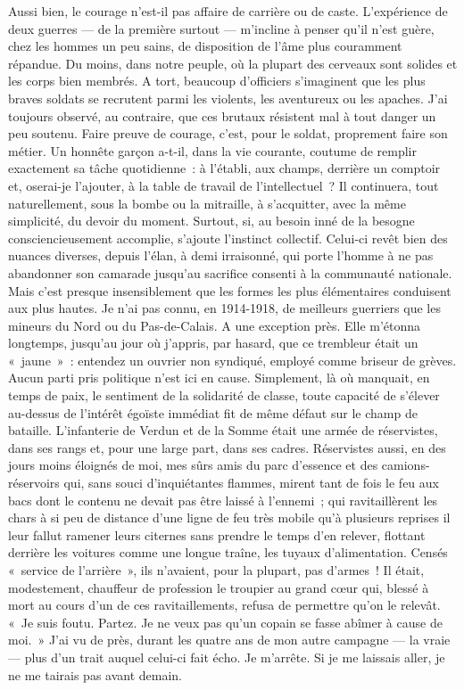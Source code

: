 \documentclass[french,twoside]{book} %
\begin{document}
Aussi bien, le courage n’est-il pas affaire de carrière ou de caste. L’expérience de deux guerres — de la première surtout — m’incline à penser qu’il n’est guère, chez les hommes un peu sains, de disposition de l’âme plus couramment répandue. Du moins, dans notre peuple, où la plupart des cerveaux sont solides et les corps bien membrés. A tort, beaucoup d’officiers s’imaginent que les plus braves soldats se recrutent parmi les violents, les aventureux ou les apaches. J’ai toujours observé, au contraire, que ces brutaux résistent mal à tout danger un peu soutenu. Faire preuve de courage, c’est, pour le soldat, proprement faire son métier. Un honnête garçon a-t-il, dans la vie courante, coutume de remplir exactement sa tâche quotidienne : à l’établi, aux champs, derrière un comptoir et, oserai-je l’ajouter, à la table de travail de l’intellectuel ? Il continuera, tout naturellement, sous la bombe ou la mitraille, à s’acquitter, avec la même simplicité, du devoir du moment. Surtout, si, au besoin inné de la besogne consciencieusement accomplie, s’ajoute l’instinct collectif. Celui-ci revêt bien des nuances diverses, depuis l’élan, à demi irraisonné, qui porte l’homme à ne pas abandonner son camarade jusqu’au sacrifice consenti à la communauté nationale. Mais c’est presque insensiblement que les formes les plus élémentaires conduisent aux plus hautes. Je n’ai pas connu, en 1914-1918, de meilleurs guerriers que les mineurs du Nord ou du Pas-de-Calais. A une exception près. Elle m’étonna longtemps, jusqu’au jour où j’appris, par hasard, que ce trembleur était un « jaune » : entendez un ouvrier non syndiqué, employé comme briseur de grèves. Aucun parti pris politique n’est ici en cause. Simplement, là où manquait, en temps de paix, le sentiment de la solidarité de classe,   toute capacité de s’élever au-dessus de l’intérêt égoïste immédiat fit de même défaut sur le champ de bataille. L’infanterie de Verdun et de la Somme était une armée de réservistes, dans ses rangs et, pour une large part, dans ses cadres. Réservistes aussi, en des jours moins éloignés de moi, mes sûrs amis du parc d’essence et des camions-réservoirs qui, sans souci d’inquiétantes flammes, mirent tant de fois le feu aux bacs dont le contenu ne devait pas être laissé à l’ennemi ; qui ravitaillèrent les chars à si peu de distance d’une ligne de feu très mobile qu’à plusieurs reprises il leur fallut ramener leurs citernes sans prendre le temps d’en relever, flottant derrière les voitures comme une longue traîne, les tuyaux d’alimentation. Censés « service de l’arrière », ils n’avaient, pour la plupart, pas d’armes ! Il était, modestement, chauffeur de profession le troupier au grand cœur qui, blessé à mort au cours d’un de ces ravitaillements, refusa de permettre qu’on le relevât. « Je suis foutu. Partez. Je ne veux pas qu’un copain se fasse abîmer à cause de moi. » J’ai vu de près, durant les quatre ans de mon autre campagne — la vraie — plus d’un trait auquel celui-ci fait écho. Je m’arrête. Si je me laissais aller, je ne me tairais pas avant demain.\par
\end{document}
